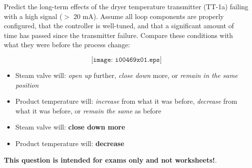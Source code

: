 

Predict the long-term effects of the dryer temperature transmitter (TT-1a) failing with a high signal ($>$ 20 mA).  Assume all loop components are properly configured, that the controller is well-tuned, and that a significant amount of time has passed since the transmitter failure.  Compare these conditions with what they were before the process change:

$$\texttt{[image: i00469x01.eps]}$$

\begin{itemize}
\item{} Steam valve will: {\it open up} further, {\it close down} more, or {\it remain in the same position} 
\vskip 10pt
\item{} Product temperature will: {\it increase} from what it was before, {\it decrease} from what it was before, or {\it remain the same} as before
\end{itemize}







\begin{itemize}
\item{} Steam valve will: {\bf close down more} 
\vskip 5pt
\item{} Product temperature will: {\bf decrease}
\end{itemize}







{\bf This question is intended for exams only and not worksheets!}.



